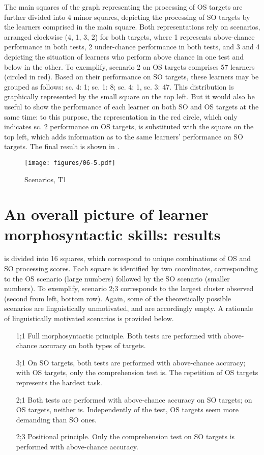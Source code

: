 The main squares of the graph representing the processing of OS targets are further divided into 4 minor squares, depicting the processing of SO targets by the learners comprised in the main square. Both representations rely on scenarios, arranged clockwise (4, 1, 3, 2) for both targets, where 1 represents above-chance performance in both tests, 2 under-chance performance in both tests, and 3 and 4 depicting the situation of learners who perform above chance in one test and below in the other. To exemplify, scenario 2 on OS targets comprises 57 learners (circled in red). Based on their performance on SO targets, these learners may be grouped as follows: sc. 4: 1; sc. 1: 8; sc. 4: 1, sc. 3: 47. This distribution is graphically represented by the small square on the top left. But it would also be useful to show the performance of each learner on both SO and OS targets at the same time: to this purpose, the representation in the red circle, which only indicates sc. 2 performance on OS targets, is substituted with the square on the top left, which adds information as to the same learners’ performance on SO targets. The final result is shown in .

\begin{figure}
    \texttt{[image: figures/06-5.pdf]}
    \caption{Scenarios, T1}
    \label{fig:06:5}
\end{figure}

\section{An overall picture of learner morphosyntactic skills: results}\label{sec:06:3}

 is divided into 16 squares, which correspond to unique combinations of OS and SO processing scores. Each square is identified by two coordinates, corresponding to the OS scenario (large numbers) followed by the SO scenario (smaller numbers). To exemplify, scenario 2;3 corresponds to the largest cluster observed (second from left, bottom row). Again, some of the theoretically possible scenarios are linguistically unmotivated, and are accordingly empty. A rationale of linguistically motivated scenarios is provided below.

\begin{itemize}
    \item[1;1] Full morphosyntactic principle. Both tests are performed with above-chance accuracy on both types of targets.
    \item [3;1] On SO targets, both tests are performed with above-chance accuracy; with OS targets, only the comprehension test is. The repetition of OS targets represents the hardest task.
    \item[2;1] Both tests are performed with above-chance accuracy on SO targets; on OS targets, neither is. Independently of the test, OS targets seem more demanding than SO ones.
    \item[2;3] Positional principle. Only the comprehension test on SO targets is performed with above-chance accuracy. 
\end{itemize}

